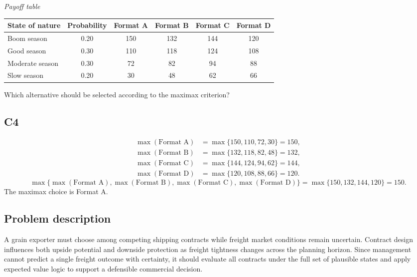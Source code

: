 \begin{ExamProblems}
		\begin{center}
			\textit{Payoff table} \par
			\begin{tabular}{l c c c c c}
				\toprule
				State of nature & Probability & Format A & Format B & Format C & Format D \\
				\midrule
				Boom season & 0.20 & 150 & 132 & 144 & 120 \\
				Good season & 0.30 & 110 & 118 & 124 & 108 \\
				Moderate season & 0.30 & 72 & 82 & 94 & 88 \\
				Slow season & 0.20 & 30 & 48 & 62 & 66 \\
				\bottomrule
			\end{tabular}
		\end{center}

		Which alternative should be selected according to the maximax criterion?

		\subsection*{C4}
		\[
		\begin{aligned}
		\max(\text{Format A}) &= \max\{150,110,72,30\} = 150,\\
		\max(\text{Format B}) &= \max\{132,118,82,48\} = 132,\\
		\max(\text{Format C}) &= \max\{144,124,94,62\} = 144,\\
		\max(\text{Format D}) &= \max\{120,108,88,66\} = 120.
		\end{aligned}
		\]
		\[
		\max\{\max(\text{Format A}),\max(\text{Format B}),\max(\text{Format C}),\max(\text{Format D})\}
		= \max\{150,132,144,120\}
		= 150.
		\]
		The maximax choice is Format A.
		\item
		\subsection*{Problem description}
		A grain exporter must choose among competing shipping contracts while freight market conditions remain uncertain. Contract design influences both upside potential and downside protection as freight tightness changes across the planning horizon. Since management cannot predict a single freight outcome with certainty, it should evaluate all contracts under the full set of plausible states and apply expected value logic to support a defensible commercial decision.


\end{ExamProblems}
